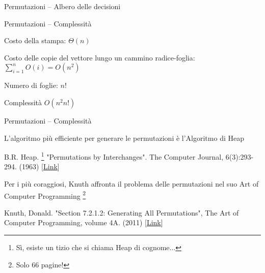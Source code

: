 \begin{frame}{Permutazioni -- Albero delle decisioni}

\begin{center}
\scalebox{1.2}{

}
\end{center}

\end{frame}


\begin{frame}{Permutazioni -- Complessità}

\vspace{-9pt}
\begin{myboxtitle}[Complessità]
\BIL
\item Costo della stampa: $\Theta(n)$
\item Costo delle copie del vettore lungo un cammino radice-foglia:
$
  \sum_{i=1}^n O(i) = O(n^2)
$
\item Numero di foglie: $n!$
\item Complessità $O(n^2 n!)$
\EIL
\end{myboxtitle}

\end{frame}

\begin{frame}{Permutazioni -- Complessità}

\begin{myboxtitle}
\BIL
\item L'algoritmo più efficiente per generare le permutazioni è l'Algoritmo di Heap 
  \BI
  \item B.R. Heap. \footnote{Sì, esiste un tizio che si chiama Heap di cognome...} "Permutations by Interchanges". The Computer Journal, 6(3):293-294. (1963) [\href{https://academic.oup.com/comjnl/article/6/3/293/360213}{Link}]
  \EI
\item Per i più coraggiosi, Knuth affronta il problema delle permutazioni nel suo Art of Computer Programming \footnote{Solo 66 pagine!}
  \BI
  \item Knuth, Donald. "Section 7.2.1.2: Generating All Permutations", The Art of Computer Programming, volume 4A.  (2011)
  [\href{http://www-cs-faculty.stanford.edu/~uno/fasc2b.ps.gz}{Link}]
  \EI
\EIL
\end{myboxtitle}

\end{frame}

